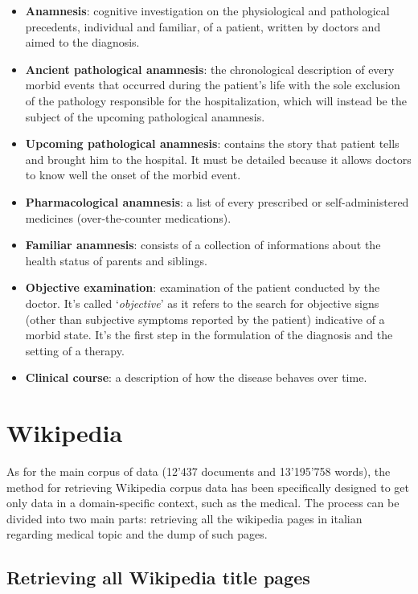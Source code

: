 \begin{itemize}
	\item \textbf{Anamnesis}: cognitive investigation on the physiological and pathological precedents, individual and familiar, of a patient, written by doctors and aimed to the diagnosis. 
	\item \textbf{Ancient pathological anamnesis}: the chronological description of every morbid events that occurred during the patient's life with the sole exclusion of the pathology responsible for the hospitalization, which will instead be the subject of the upcoming pathological anamnesis. 
	\item \textbf{Upcoming pathological anamnesis}: contains the story that patient tells and brought him to the hospital. It must be detailed because it allows doctors to know well the onset of the morbid event.
	\item \textbf{Pharmacological anamnesis}: a list of every prescribed or self-administered medicines (over-the-counter medications).
	\item \textbf{Familiar anamnesis}: consists of a collection of informations about the health status of parents and siblings.
	\item \textbf{Objective examination}: examination of the patient conducted by the doctor. It's called \enquote*{\textit{objective}} as it refers to the search for objective signs (other than subjective symptoms reported by the patient) indicative of a morbid state. It's the first step in the formulation of the diagnosis and the setting of a therapy.
	\item \textbf{Clinical course}: a description of how the disease behaves over time.
\end{itemize}

\section{Wikipedia}

As for the main corpus of data (12'437 documents and 13'195'758 words), the method for retrieving Wikipedia corpus data has been specifically designed to get only data in a domain-specific context, such as the medical.
The process can be divided into two main parts: retrieving all the wikipedia pages in italian regarding medical topic and the dump of such pages.

\subsection{Retrieving all Wikipedia title pages}

